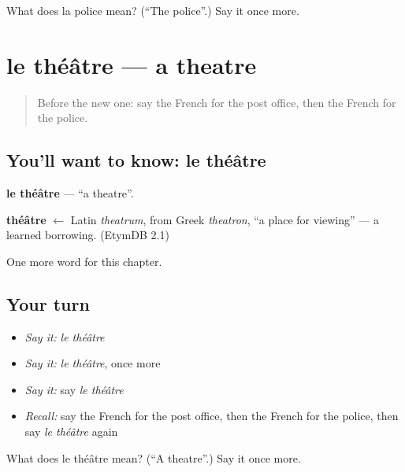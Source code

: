 \begin{tcolorbox}[breakable,colback=teal!4,colframe=teal!35!black,title={Before you move on}]
What does la police mean? (\textquotedblleft{}The police\textquotedblright{}.) Say it once more.
\end{tcolorbox}
\section[le théâtre]{le théâtre — a theatre}

\label{lesson:FR-C102-theatre}



\begin{quote}
Before the new one: say the French for the post office, then the French for the police.
\end{quote}

\subsection*{You'll want to know: le théâtre}
\textbf{le théâtre} — \textquotedblleft{}a theatre\textquotedblright{}.

\begin{cousinweb}
\textbf{théâtre} $\leftarrow$ Latin \emph{theatrum}, from Greek \emph{theatron}, \textquotedblleft{}a place for viewing\textquotedblright{} — a learned borrowing. (EtymDB 2.1)
\end{cousinweb}

\begin{grammarlens}[title={What you've built}]
One more word for this chapter.
\end{grammarlens}

\subsection*{Your turn}
\begin{itemize}
\raggedright
  \item \emph{Say it:} \emph{le théâtre}
  \item \emph{Say it:} \emph{le théâtre}, once more
  \item \emph{Say it:} say \emph{le théâtre}
  \item \emph{Recall:} say the French for the post office, then the French for the police, then say \emph{le théâtre} again
\end{itemize}

\begin{tcolorbox}[breakable,colback=teal!4,colframe=teal!35!black,title={Before you move on}]
What does le théâtre mean? (\textquotedblleft{}A theatre\textquotedblright{}.) Say it once more.
\end{tcolorbox}
